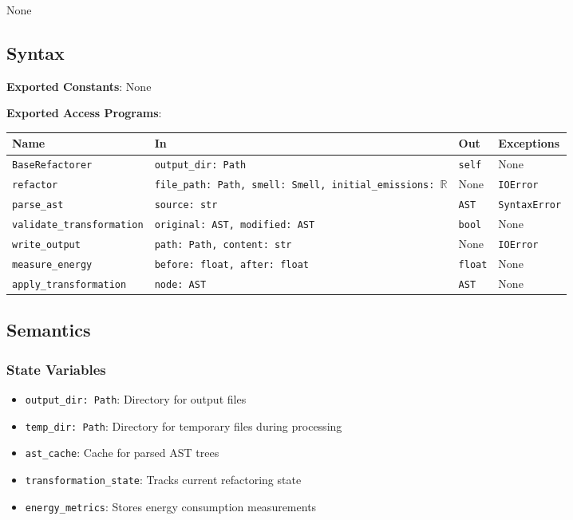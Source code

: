 \documentclass[12pt, titlepage]{article}
\begin{document}
None

\subsection{Syntax}
\noindent
\textbf{Exported Constants}: None

\noindent
\textbf{Exported Access Programs}:

\begin{tabularx}{\linewidth}{|l|>{\raggedright\arraybackslash}X|l|l|}
\hline
\textbf{Name} & \textbf{In} & \textbf{Out} & \textbf{Exceptions} \\\hline
\texttt{BaseRefactorer} & \texttt{output\_dir: Path} & \texttt{self} & None \\\hline
\texttt{refactor} & \texttt{file\_path: Path, smell: Smell, initial\_emissions: $\mathbb{R}$} & None & \texttt{IOError} \\\hline
\texttt{parse\_ast} & \texttt{source: str} & \texttt{AST} & \texttt{SyntaxError} \\\hline
\texttt{validate\_transformation} & \texttt{original: AST, modified: AST} & \texttt{bool} & None \\\hline
\texttt{write\_output} & \texttt{path: Path, content: str} & None & \texttt{IOError} \\\hline
\texttt{measure\_energy} & \texttt{before: float, after: float} & \texttt{float} & None \\\hline
\texttt{apply\_transformation} & \texttt{node: AST} & \texttt{AST} & None \\\hline
\end{tabularx}

\subsection{Semantics}

\subsubsection{State Variables}
\begin{itemize}
  \item \texttt{output\_dir: Path}: Directory for output files
  \item \texttt{temp\_dir: Path}: Directory for temporary files during processing
  \item \texttt{ast\_cache}: Cache for parsed AST trees
  \item \texttt{transformation\_state}: Tracks current refactoring state
  \item \texttt{energy\_metrics}: Stores energy consumption measurements
\end{itemize}
\end{document}
